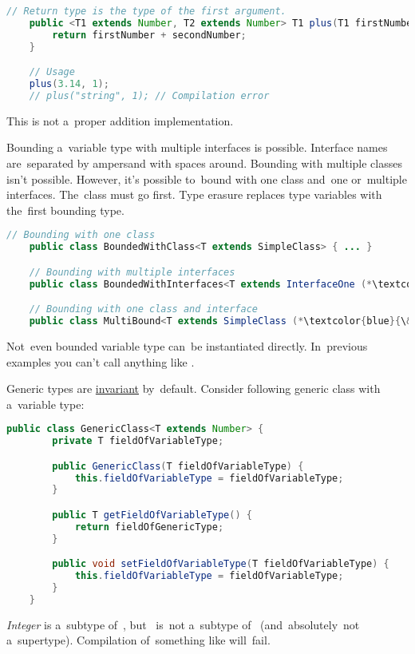 \begin{lstlisting}[language=Java]
    // Return type is the type of the first argument.
    public <T1 extends Number, T2 extends Number> T1 plus(T1 firstNumber, T2 secondNumber) {
        return firstNumber + secondNumber;
    }

    // Usage
    plus(3.14, 1);
    // plus("string", 1); // Compilation error
\end{lstlisting}
\warningnonl This is not a~proper addition implementation.
\newline

\noindent Bounding a~variable type with multiple interfaces is possible.
Interface names are~separated by ampersand with spaces around.
Bounding with multiple classes isn't possible.
However, it's possible to~bound with one class and~one or~multiple interfaces.
The~class must go first.
Type erasure replaces type variables with the~first bounding type.

\newline
{}
\begin{lstlisting}[language=Java]
    // Bounding with one class
    public class BoundedWithClass<T extends SimpleClass> { ... }

    // Bounding with multiple interfaces
    public class BoundedWithInterfaces<T extends InterfaceOne (*\textcolor{blue}{\&}*) InterfaceTwo (*\textcolor{blue}{\&}*) InterfaceThree> { ... }

    // Bounding with one class and interface
    public class MultiBound<T extends SimpleClass (*\textcolor{blue}{\&}*) InterfaceOne> { ... }
\end{lstlisting}

\note Not~even bounded variable type can~be instantiated directly.
In~previous examples you can't call anything like .
\newpage

\label{javagenericswildcards}
Generic types are \hyperref[invariance]{invariant} by~default.
Consider following generic class with a~variable type:
\begin{lstlisting}[language=Java]
    public class GenericClass<T extends Number> {
        private T fieldOfVariableType;

        public GenericClass(T fieldOfVariableType) {
            this.fieldOfVariableType = fieldOfVariableType;
        }

        public T getFieldOfVariableType() {
            return fieldOfGenericType;
        }

        public void setFieldOfVariableType(T fieldOfVariableType) {
            this.fieldOfVariableType = fieldOfVariableType;
        }
    }
\end{lstlisting}
\noindent \textit{Integer} is a~subtype of~, but~ is~not a~subtype of~ (and~absolutely~not a~supertype).
Compilation of~something like  will~fail.

